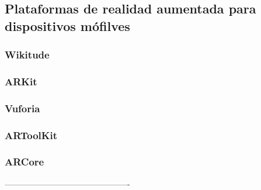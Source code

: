 \subsection{Plataformas de realidad aumentada para dispositivos mófilves}

\subsubsection{Wikitude}
\subsubsection{ARKit}
\subsubsection{Vuforia}
\subsubsection{ARToolKit}
\subsubsection{ARCore}


----------------------------------------------





